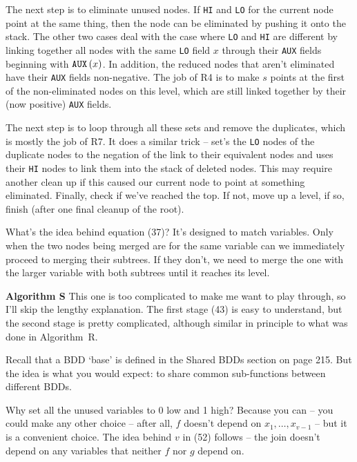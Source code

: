 The next step is to eliminate unused nodes. If {\tt HI} and {\tt LO} for the current node
point at the same thing, then the node can be eliminated by pushing it onto
the stack.  The other two cases deal with the case where {\tt LO}
and {\tt HI} are different by linking together all nodes with the same
{\tt LO} field $x$ through their {\tt AUX} fields beginning with ${\tt AUX}\left(x\right)$.
In addition, the reduced nodes that aren't eliminated have their {\tt AUX} fields 
non-negative.  The job of R4 is to make $s$ points at the first of the 
non-eliminated nodes on this level, which are still linked together by their
(now positive) {\tt AUX} fields.

The next step is to loop through all these sets and remove the duplicates,
which is mostly the job of R7.  It does a similar trick -- set's the {\tt LO}
nodes of the duplicate nodes to the negation of the link to their equivalent
nodes and uses their {\tt HI} nodes to link them into the stack of deleted
nodes.  This may require another clean up if this caused our current node
to point at something eliminated.  Finally, check if we've reached the top.
If not, move up a level, if so, finish (after one final cleanup of the root).


\noindent [p 218] What's the idea behind equation (37)?  It's designed
to match variables.  Only when the two nodes being merged are
for the same variable can we immediately proceed to merging their
subtrees.  If they don't, we need to merge the one with the larger
variable with both subtrees until it reaches its level.

 {\bf Algorithm S}
This one is too complicated to make me want to play through, so
I'll skip the lengthy explanation.  The first stage (43) is easy
to understand, but the second stage is pretty complicated, although
similar in principle to what was done in Algorithm~R.

\vskip 0.08in 

\noindent Recall that a BDD `base' is defined in the Shared BDDs section
on page 215.  But the idea is what you would expect: to share
common sub-functions between different BDDs.

\noindent [p 225] Why set all the unused variables to 0 low
and 1 high?  Because you can -- you could make any other
choice -- after all, $f$ doesn't depend on $x_1, \ldots, x_{v-1}$ --
but it is a convenient choice.  The idea behind $v$ in (52) follows --
the join doesn't depend on any variables that neither $f$ nor $g$
depend on.

